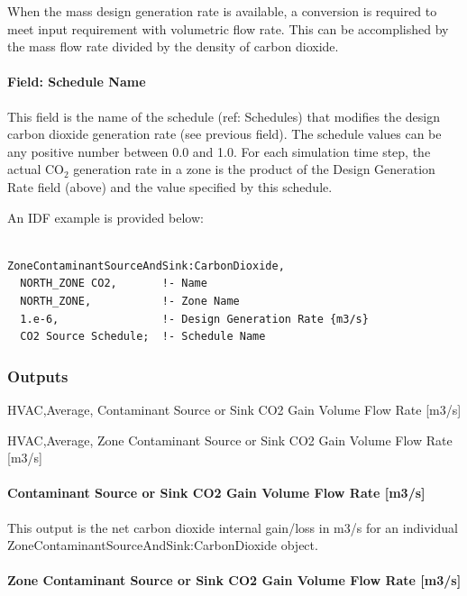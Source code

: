 When the mass design generation rate is available, a conversion is required to meet input requirement with volumetric flow rate. This can be accomplished by the mass flow rate divided by the density of carbon dioxide.

\paragraph{Field: Schedule Name}\label{field-schedule-name-6-000}

This field is the name of the schedule (ref: Schedules) that modifies the design carbon dioxide generation rate (see previous field). The schedule values can be any positive number between 0.0 and 1.0. For each simulation time step, the actual CO\(_{2}\) generation rate in a zone is the product of the Design Generation Rate field (above) and the value specified by this schedule.

An IDF example is provided below:

\begin{lstlisting}

ZoneContaminantSourceAndSink:CarbonDioxide,
  NORTH_ZONE CO2,       !- Name
  NORTH_ZONE,           !- Zone Name
  1.e-6,                !- Design Generation Rate {m3/s}
  CO2 Source Schedule;  !- Schedule Name
\end{lstlisting}

\subsubsection{Outputs}\label{outputs-6-004}

HVAC,Average, Contaminant Source or Sink CO2 Gain Volume Flow Rate {[}m3/s{]}

HVAC,Average, Zone Contaminant Source or Sink CO2 Gain Volume Flow Rate {[}m3/s{]}

\paragraph{Contaminant Source or Sink CO2 Gain Volume Flow Rate {[}m3/s{]}}\label{contaminant-source-or-sink-co2-gain-volume-flow-rate-m3s}

This output is the net carbon dioxide internal gain/loss in m3/s for an individual ZoneContaminantSourceAndSink:CarbonDioxide object.

\paragraph{Zone Contaminant Source or Sink CO2 Gain Volume Flow Rate {[}m3/s{]}}\label{zone-contaminant-source-or-sink-co2-gain-volume-flow-rate-m3s}

